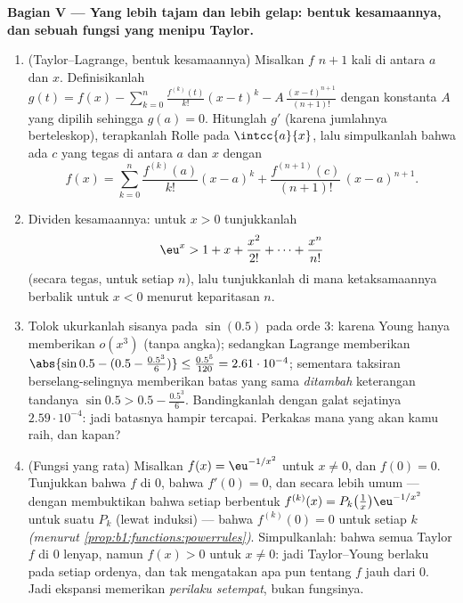 \begin{problem}
\medskip
\noindent\textbf{Bagian V --- Yang lebih tajam dan lebih gelap: bentuk
kesamaannya, dan sebuah fungsi yang menipu Taylor.}
\begin{enumerate}[resume]
  \item (Taylor--Lagrange, bentuk kesamaannya) Misalkan $f$ 
        $n + 1$ kali di antara $a$ dan $x$. Definisikanlah $g(t) =
        f(x) - \sum_{k=0}^{n} \frac{f^{(k)}(t)}{k!}(x - t)^k -
        A\,\frac{(x-t)^{n+1}}{(n+1)!}$ dengan konstanta $A$ yang
        dipilih sehingga $g(a) = 0$. Hitunglah $g'$ (karena jumlahnya
        berteleskop), terapkanlah Rolle pada $\intcc{a}{x}$, lalu simpulkanlah
        bahwa ada $c$ yang tegas di antara $a$ dan $x$ dengan
        \[
        f(x) = \sum_{k=0}^{n} \frac{f^{(k)}(a)}{k!}(x-a)^k
        + \frac{f^{(n+1)}(c)}{(n+1)!}\,(x-a)^{n+1} .
        \]
  \item Dividen kesamaannya: untuk $x > 0$ tunjukkanlah
        \[
        \eu^x > 1 + x + \frac{x^2}{2!} + \dots +
        \frac{x^n}{n!}
        \]
        (secara tegas, untuk setiap $n$), lalu tunjukkanlah di mana
        ketaksamaannya berbalik untuk $x < 0$ menurut keparitasan
        $n$.
  \item Tolok ukurkanlah sisanya pada $\sin(0.5)$ pada orde $3$:
        karena Young hanya memberikan $o(x^3)$ (tanpa angka); sedangkan Lagrange memberikan
        $\abs{\sin 0.5 - (0.5 - \frac{0.5^3}{6})} \leq
        \frac{0.5^5}{120} = 2.61\cdot10^{-4}$; sementara taksiran
        berselang-selingnya memberikan batas yang sama \emph{ditambah} keterangan
        tandanya $\sin 0.5 > 0.5 - \frac{0.5^3}{6}$. Bandingkanlah
        dengan galat sejatinya $2.59\cdot10^{-4}$: jadi batasnya
        hampir tercapai. Perkakas mana yang akan kamu raih, dan
        kapan?
  \item (Fungsi yang rata) Misalkan $f(x) = \eu^{-1/x^2}$ untuk $x
        \neq 0$, dan $f(0) = 0$. Tunjukkan bahwa $f$  di $0$, bahwa
        $f'(0) = 0$, dan secara lebih umum --- dengan membuktikan bahwa
        setiap  berbentuk $f^{(k)}(x) =
        P_k\bigl(\frac1x\bigr)\eu^{-1/x^2}$ untuk suatu 
        $P_k$ (lewat induksi) --- bahwa $f^{(k)}(0) = 0$ untuk setiap $k$
        \emph{(menurut 
        \cref{prop:b1:functions:powerrules})}. Simpulkanlah: bahwa semua
         Taylor $f$ di $0$ lenyap, namun $f(x) > 0$
        untuk $x \neq 0$: jadi Taylor--Young berlaku pada setiap ordenya, dan
        tak mengatakan apa pun tentang $f$ jauh dari $0$. Jadi ekspansi
        memerikan \emph{perilaku setempat}, bukan fungsinya.
\end{enumerate}


\end{problem}
